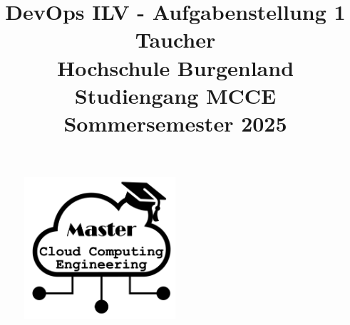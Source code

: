 \begin{figure}
    \centering
    \includegraphics[width=0.5\textwidth]{fig/Fig1.png}
    \label{fig:title-image}
\end{figure}


\title{
    DevOps ILV - Aufgabenstellung 1 Taucher \\
    \vspace{0.5cm}
    \large{Hochschule Burgenland} \\
    \large{Studiengang MCCE} \\
    \large{Sommersemester 2025}
}

